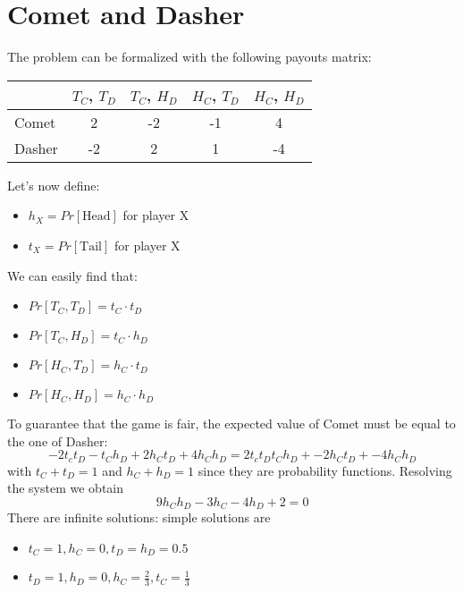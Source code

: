 \section{Comet and Dasher}
The problem can be formalized with the following payouts matrix:
\begin{center}
	\begin{tabular}{l*{4}{c}}
		& $T_C$, $T_D$ & $T_C$, $H_D$ & $H_C$, $T_D$ & $H_C$, $H_D$ \\
		\hline
		Comet & 2 & -2 & -1 & 4 \\
		\hline
		Dasher & -2 & 2 & 1 & -4 \\
	\end{tabular}
\end{center}
Let's now define:
\begin{itemize}
\item $h_X = Pr[\text{Head}]$ for player X
\item $t_X = Pr[\text{Tail}]$ for player X
\end{itemize}
We can easily find that:
\begin{itemize}
\item $Pr[T_C, T_D] = t_C \cdot t_D$
\item $Pr[T_C, H_D] = t_C \cdot h_D$
\item $Pr[H_C, T_D] = h_C \cdot t_D$
\item $Pr[H_C, H_D] = h_C \cdot h_D$
\end{itemize}
To guarantee that the game is fair, the expected value of Comet must be equal to the one of Dasher:
\[
-2 t_c t_D -t_C h_D + 2h_C t_D + 4 h_C h_D = 2 t_c t_D t_C h_D + -2h_C t_D + -4 h_C h_D
\]
with $t_C + t_D = 1$ and $h_C + h_D = 1$ since they are probability functions.
Resolving the system we obtain 
\[9h_C h_D -3h_C - 4h_D +2 = 0\]
There are infinite solutions: simple solutions are 
\begin{itemize}
	\item $t_C = 1, h_C = 0, t_D = h_D = 0.5$
	\item $t_D = 1, h_D = 0, h_C = \frac{2}{3}, t_C = \frac{1}{3}$	
\end{itemize}
